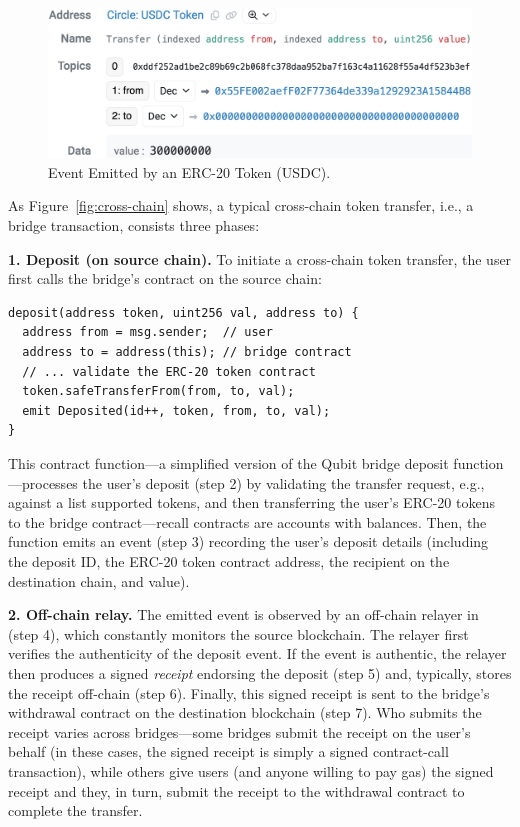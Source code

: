 \begin{figure}[t]
\centering
\includegraphics[width=\columnwidth]{fig/token.png}
\caption{Event Emitted by an ERC-20 Token (USDC).}
\label{fig:erc20-event}
\end{figure}

As Figure~\ref{fig:cross-chain} shows, a typical cross-chain token transfer,
i.e., a bridge transaction, consists three phases:

\textbf{1. Deposit (on source chain).}
To initiate a cross-chain token transfer, the user first calls the bridge's
contract on the source chain:
\begin{lstlisting}
deposit(address token, uint256 val, address to) {
  address from = msg.sender;  // user
  address to = address(this); // bridge contract
  // ... validate the ERC-20 token contract
  token.safeTransferFrom(from, to, val);
  emit Deposited(id++, token, from, to, val);
}
\end{lstlisting}
This contract function---a simplified version of the Qubit bridge deposit
function---processes the user's deposit (step 2) by validating the transfer request,
e.g., against a list supported tokens, and then transferring the user's ERC-20
tokens to the bridge contract---recall contracts are accounts with balances.
Then, the function emits an event (step 3) recording the user's deposit details
(including the deposit ID, the ERC-20 token contract address, the recipient on
the destination chain, and value).

\textbf{2. Off-chain relay.}
The emitted event is observed by an off-chain relayer in (step 4),
which constantly monitors the source blockchain.  The relayer first
verifies the authenticity of the deposit event.  If the event is
authentic, the relayer then produces a signed \emph{receipt}
endorsing the deposit (step 5) and, typically, stores the receipt off-chain (step
6).  Finally, this signed receipt is sent to the bridge's withdrawal contract
on the destination blockchain (step 7). Who submits the receipt varies across
bridges---some bridges submit the receipt on the user's behalf (in these cases, the
signed receipt is simply a signed contract-call transaction), while others give
users (and anyone willing to pay gas) the signed receipt and they, in turn,
submit the receipt to the withdrawal contract to complete the transfer. 

